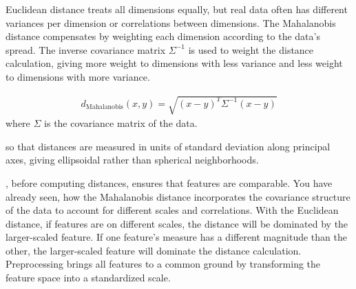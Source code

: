 Euclidean distance treats all dimensions equally, but real data often has different variances per dimension or correlations 
between dimensions. The Mahalanobis distance compensates by weighting each dimension according to the data's spread. The inverse covariance matrix $\Sigma^{-1}$ is used to weight the distance calculation, 
giving more weight to dimensions with less variance and less weight to dimensions with more variance.

\begin{align*}
    d_{\text{Mahalanobis}}(x, y) = \sqrt{(x-y)^T \Sigma^{-1} (x-y)}
\end{align*}
where $\Sigma$ is the covariance matrix of the data.

 so that distances are measured in units of standard deviation along principal axes, 
giving ellipsoidal rather than spherical neighborhoods.







\vspace{2.5em}
, before computing distances, 
ensures that features are comparable. You have already seen, how the 
Mahalanobis distance incorporates the covariance structure of the data 
to account for different scales and correlations. With the Euclidean distance, 
if features are on different scales, 
the distance will be dominated by the larger-scaled feature.
If one feature's measure has a different magnitude than the other, 
the larger-scaled feature will dominate the distance calculation. 
Preprocessing brings all features to a common ground by 
transforming the feature space into a standardized scale.


